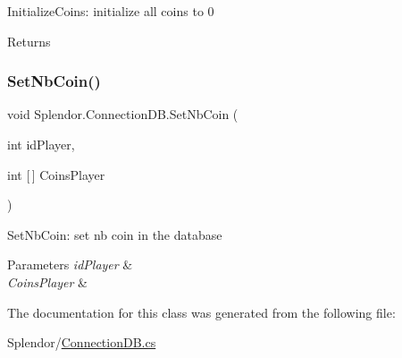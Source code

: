 Initialize\+Coins\+: initialize all coins to 0 

\begin{DoxyReturn}{Returns}

\end{DoxyReturn}
\mbox{\label{class_splendor_1_1_connection_d_b_ada04458a2782836ab633175708445c36}} 
\subsubsection{\texorpdfstring{Set\+Nb\+Coin()}{SetNbCoin()}}
{\footnotesize\ttfamily void Splendor.\+Connection\+D\+B.\+Set\+Nb\+Coin (\begin{DoxyParamCaption}\item[{int}]{id\+Player,  }\item[{int \mbox{[}$\,$\mbox{]}}]{Coins\+Player }\end{DoxyParamCaption})}



Set\+Nb\+Coin\+: set nb coin in the database 


\begin{DoxyParams}{Parameters}
{\em id\+Player} & \\
\hline
{\em Coins\+Player} & \\
\hline
\end{DoxyParams}


The documentation for this class was generated from the following file\+:\begin{DoxyCompactItemize}
\item 
Splendor/\hyperlink{_connection_d_b_8cs}{Connection\+D\+B.\+cs}\end{DoxyCompactItemize}
